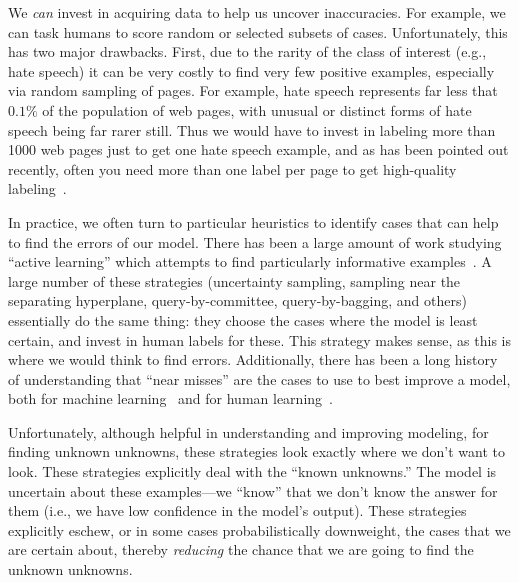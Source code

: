 We \textit{can} invest in acquiring data to help us uncover
inaccuracies.  For example, we can task humans to score random or
selected subsets of cases.  Unfortunately, this has two major
drawbacks.  First, due to the rarity of the class of interest (e.g.,
hate speech) it can be very costly to find very few positive examples,
especially via random sampling of pages.  For example, hate speech
represents far less that $0.1\%$ of the population of web pages, with unusual or distinct forms of hate speech being far rarer still. Thus we would
have to invest in labeling more than 1000 web pages just to get one hate speech
example, and as has been pointed out
recently, often you need more than one label per page to get
high-quality labeling~\cite{shengKDD2008,raykar2009supervised}.




In practice, we often turn to particular heuristics to identify
cases that can help to find the errors of our model.  There has been a
large amount of work studying ``active learning'' which attempts to
find particularly informative examples~\cite{SettlesActiveLearning}.
A large number of these strategies (uncertainty sampling, sampling
near the separating hyperplane, query-by-committee, query-by-bagging,
and others) essentially do the same thing: they choose the cases where
the model is least certain, and invest in human labels for these.
This strategy makes sense, as this is where we would think to find
errors.  Additionally, there has been a long history of understanding that
``near misses'' are the cases to use to best improve a model, both for
machine learning~\cite{winston1970learning} and for human
learning~\cite{vanlehn1998analogy}.

Unfortunately, although helpful in understanding and improving
modeling, for finding unknown unknowns, 
these strategies look exactly where we don't want to look.
These strategies explicitly deal with the ``known unknowns.''  The
model is uncertain about these examples---we ``know'' that we don't
know the answer for them (i.e., we have low confidence in the model's
output).  These strategies explicitly eschew, or in some cases
probabilistically downweight, the cases that we are
certain about, thereby \textit{reducing} the chance that we are going
to find the unknown unknowns.

